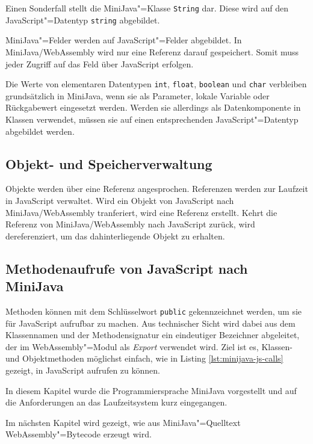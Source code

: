 Einen Sonderfall stellt die MiniJava"=Klasse \lstinline{String} dar. Diese wird auf den JavaScript"=Datentyp \lstinline{string} abgebildet.

MiniJava"=Felder werden auf JavaScript"=Felder abgebildet. In MiniJava/WebAssembly wird nur eine Referenz darauf gespeichert. Somit muss jeder Zugriff auf das Feld über JavaScript erfolgen.

Die Werte von elementaren Datentypen \lstinline{int}, \lstinline{float}, \lstinline{boolean} und \lstinline{char} verbleiben grundsätzlich in MiniJava, wenn sie als Parameter, lokale Variable oder Rückgabewert eingesetzt werden. Werden sie allerdings als Datenkomponente in Klassen verwendet, müssen sie auf einen entsprechenden JavaScript"=Datentyp abgebildet werden.

\subsection{Objekt- und Speicherverwaltung}
Objekte werden über eine Referenz angesprochen. Referenzen werden zur Laufzeit in JavaScript verwaltet. Wird ein Objekt von JavaScript nach MiniJava/WebAssembly tranferiert, wird eine Referenz erstellt. Kehrt die Referenz von MiniJava/WebAssembly nach JavaScript zurück, wird dereferenziert, um das dahinterliegende Objekt zu erhalten.

\pagebreak
\subsection{Methodenaufrufe von JavaScript nach MiniJava}
Methoden können mit dem Schlüsselwort \lstinline{public} gekennzeichnet werden, um sie für JavaScript aufrufbar zu machen. Aus technischer Sicht wird dabei aus dem Klassennamen und der Methodensignatur ein eindeutiger Bezeichner abgeleitet, der im WebAssembly"=Modul als \emph{Export} verwendet wird. Ziel ist es, Klassen- und Objektmethoden möglichst einfach, wie in Listing \ref{lst:minijava-js-calls} gezeigt, in JavaScript aufrufen zu können.



\vspace{4em}
In diesem Kapitel wurde die Programmiersprache MiniJava vorgestellt und auf die Anforderungen an das Laufzeitsystem kurz eingegangen.

Im nächsten Kapitel wird gezeigt, wie aus MiniJava"=Quelltext WebAssembly"=Bytecode erzeugt wird.
